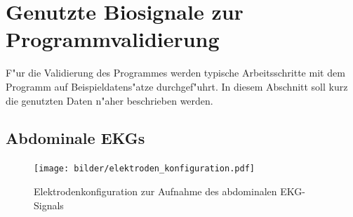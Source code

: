


\section{Genutzte Biosignale zur Programmvalidierung}
\label{sec:genutzte_biosignale}

F"ur die Validierung des Programmes werden typische Arbeitsschritte mit dem Programm auf Beispieldatens"atze durchgef"uhrt.
In diesem Abschnitt soll kurz die genutzten Daten n"aher beschrieben werden.

\subsection{Abdominale \aclp{EKG}}

\begin{figure}[bth]
	\centering
	\texttt{[image: bilder/elektroden\_konfiguration.pdf]}
	\caption[Elektrodenkonfiguration zur Aufnahme des abdominalen \ac{EKG}-Signals]{Elektrodenkonfiguration zur Aufnahme des abdominalen \ac{EKG}-Signals \cite{Zaunseder2012}}
	\label{pic:elektroden_konfig}
\end{figure}

